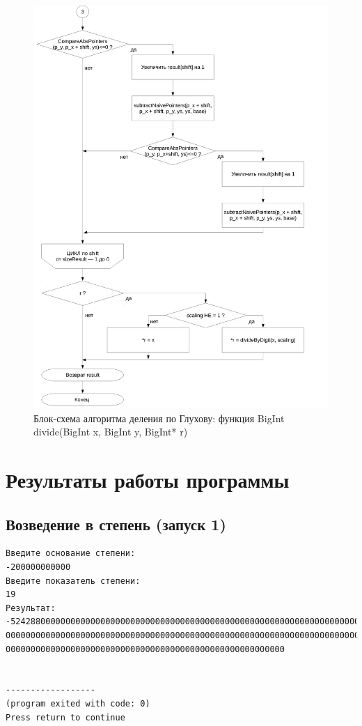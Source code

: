 \documentclass[a4paper,12pt]{article} %
\begin{document}
\begin{figure}[ht]
	\includegraphics[width=\textwidth]{lr3_divide-3.pdf}
	\caption{Блок-схема алгоритма деления по Глухову: функция BigInt divide(BigInt x, BigInt y, BigInt* r)}
\end{figure}


\clearpage

\section*{Результаты работы программы}



\subsection*{Возведение в степень (запуск 1)}
\begin{verbatim}
Введите основание степени:
-200000000000
Введите показатель степени:
19
Результат:
-5242880000000000000000000000000000000000000000000000000000000000000000000000000
00000000000000000000000000000000000000000000000000000000000000000000000000000000
00000000000000000000000000000000000000000000000000000000


------------------
(program exited with code: 0)
Press return to continue
\end{verbatim}
\end{document}
